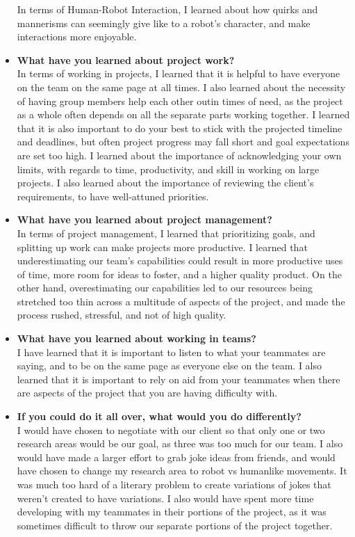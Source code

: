 \begin{itemize}
  In terms of Human-Robot Interaction, I learned about how quirks and mannerisms can seemingly give like to a robot's character, and make interactions more enjoyable.
\item{\textbf{What have you learned about project work?}} \\
  In terms of working in projects, I learned that it is helpful to have everyone on the team on the same page at all times. I also learned about the necessity of having group members help each other outin times of need, as the project as a whole often depends on all the separate parts working together. I learned that it is also important to do your best to stick with the projected timeline and deadlines, but often project progress may fall short and goal expectations are set too high. I learned about the importance of acknowledging your own limits, with regards to time, productivity, and skill in working on large projects. I also learned about the importance of reviewing the client's requirements, to have well-attuned priorities.
\item{\textbf{What have you learned about project management?}} \\
  In terms of project management, I learned that prioritizing goals, and splitting up work can make projects more productive. I learned that underestimating our team's capabilities could result in more productive uses of time, more room for ideas to foster, and a higher quality product. On the other hand, overestimating our capabilities led to our resources being stretched too thin across a multitude of aspects of the project, and made the process rushed, stressful, and not of high quality.

\item{\textbf{What have you learned about working in teams?}} \\
  I have learned that it is important to listen to what your teammates are saying, and to be on the same page as everyone else on the team. I also learned that it is important to rely on aid from your teammates when there are aspects of the project that you are having difficulty with.

\item{\textbf{If you could do it all over, what would you do differently?}} \\
  I would have chosen to negotiate with our client so that only one or two research areas would be our goal, as three was too much for our team. I also would have made a larger effort to grab joke ideas from friends, and would have chosen to change my research area to robot vs humanlike movements. It was much too hard of a literary problem to create variations of jokes that weren't created to have variations. I also would have spent more time developing with my teammates in their portions of the project, as it was sometimes difficult to throw our separate portions of the project together.


\end{itemize}
